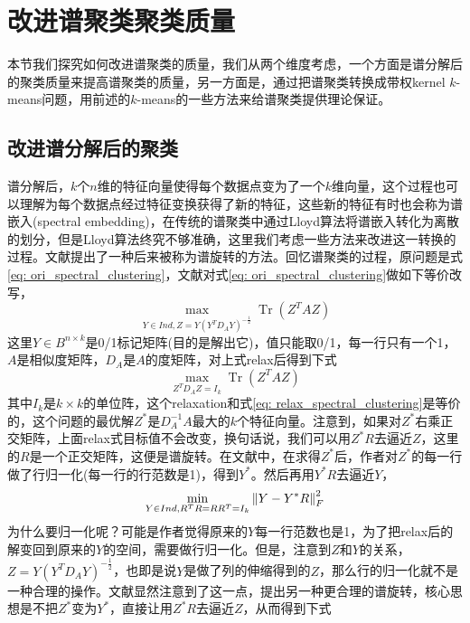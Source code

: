 \section{改进谱聚类聚类质量}
本节我们探究如何改进谱聚类的质量，我们从两个维度考虑，一个方面是谱分解后的聚类质量来提高谱聚类的质量，另一方面是，通过把谱聚类转换成带权kernel $k$-means问题，用前述的$k$-means的一些方法来给谱聚类提供理论保证。

\subsection{改进谱分解后的聚类}
谱分解后，$k$个$n$维的特征向量使得每个数据点变为了一个$k$维向量，这个过程也可以理解为每个数据点经过特征变换获得了新的特征，这些新的特征有时也会称为谱嵌入(spectral embedding)，在传统的谱聚类中通过Lloyd算法将谱嵌入转化为离散的划分，但是Lloyd算法终究不够准确，这里我们考虑一些方法来改进这一转换的过程。文献\cite{stella2003multiclass}提出了一种后来被称为谱旋转的方法。回忆谱聚类的过程，原问题是式\ref{eq: ori_spectral_clustering}，文献\cite{stella2003multiclass}对式\ref{eq: ori_spectral_clustering}做如下等价改写，
\begin{equation*}
	\max _{Y \in I n d, Z=Y\left(Y^{T} D_{A} Y\right)^{-\frac{1}{2}}} \operatorname{Tr}\left(Z^{T} A Z\right)
\end{equation*}
这里$Y \in B^{n \times k}$是0/1标记矩阵(目的是解出它)，值只能取0/1，每一行只有一个1，$A$是相似度矩阵，$D_A$是$A$的度矩阵，对上式relax后得到下式
\begin{equation*}
	\max _{Z^{T} D_{A} Z=I_{k}} \operatorname{Tr}\left(Z^{T} A Z\right)
\end{equation*}
其中$I_k$是$k\times k$的单位阵，这个relaxation和式\ref{eq: relax_spectral_clustering}是等价的，这个问题的最优解$Z^*$是$D_A^{-1}A$最大的$k$个特征向量。注意到，如果对$Z^*$右乘正交矩阵，上面relax式目标值不会改变，换句话说，我们可以用$Z^*R$去逼近$Z$，这里的$R$是一个正交矩阵，这便是谱旋转。在文献\cite{stella2003multiclass}中，在求得$Z^*$后，作者对$Z^*$的每一行做了行归一化(每一行的行范数是1)，得到$Y^*$。然后再用$Y^*R$去逼近$Y$，
\begin{equation*}
 	\min_{Y \in I n d,R^TR = RR^T = I_k} \left\lVert Y - Y^*R\right\rVert_F^2
\end{equation*}
为什么要归一化呢？可能是作者觉得原来的$Y$每一行范数也是1，为了把relax后的解变回到原来的$Y$的空间，需要做行归一化。但是，注意到$Z$和$Y$的关系，$Z=Y\left(Y^{T} D_{A} Y\right)^{-\frac{1}{2}}$，也即是说$Y$是做了列的伸缩得到的$Z$，那么行的归一化就不是一种合理的操作。文献\cite{chen2017scalable}显然注意到了这一点，提出另一种更合理的谱旋转，核心思想是不把$Z^*$变为$Y^*$，直接让用$Z^*R$去逼近$Z$，从而得到下式
